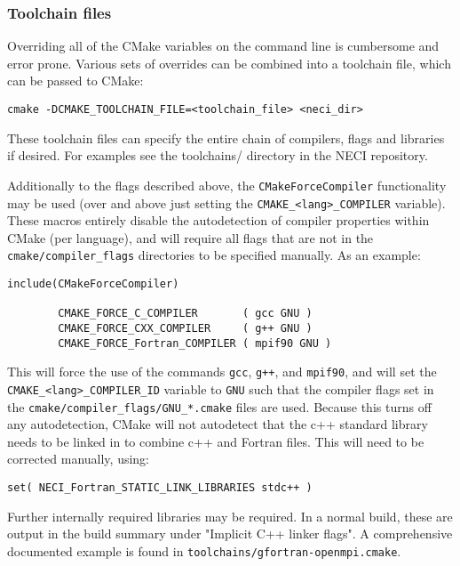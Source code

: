 \documentclass[a4paper,notitlepage,dvipsnames]{scrreprt}
\let\code\lstinline
\begin{document}
\subsubsection{Toolchain files}

    Overriding all of the CMake variables on the command line is cumbersome and error prone.
    Various sets of overrides can be combined into a toolchain file, which can be passed
    to CMake:
    \begin{lstlisting}[gobble=4]
        cmake -DCMAKE_TOOLCHAIN_FILE=<toolchain_file> <neci_dir>
    \end{lstlisting}
    These toolchain files can specify the entire chain of compilers, flags and libraries if
    desired. For examples see the toolchains/ directory in the NECI repository.

    Additionally to the flags described above, the \code{CMakeForceCompiler} functionality may
    be used (over and above just setting the \code{CMAKE_<lang>_COMPILER} variable).
    These macros entirely disable the autodetection of compiler properties within
    CMake (per language), and will require all flags that are not in the
    \code{cmake/compiler_flags} directories to be specified manually. As an example:
    \begin{lstlisting}[gobble=4]
        include(CMakeForceCompiler)

        CMAKE_FORCE_C_COMPILER       ( gcc GNU )
        CMAKE_FORCE_CXX_COMPILER     ( g++ GNU )
        CMAKE_FORCE_Fortran_COMPILER ( mpif90 GNU )
    \end{lstlisting}
    This will force the use of the commands \code{gcc}, \code{g++}, and \code{mpif90}, and will
    set the \code[breaklines=true]{CMAKE_<lang>_COMPILER_ID} variable to \code{GNU} such that
    the compiler flags set in the \code[breaklines=true]{cmake/compiler_flags/GNU_*.cmake}
    files are used. Because this turns off
    any autodetection, CMake will not autodetect that the c++ standard library needs to be
    linked in to combine c++ and Fortran files. This will need to be corrected manually, using:
    \begin{lstlisting}[gobble=4]
        set( NECI_Fortran_STATIC_LINK_LIBRARIES stdc++ )
    \end{lstlisting}
    Further internally required libraries may be required. In a normal build, these are
    output in the build summary under "Implicit C++ linker flags".
    A comprehensive documented example is found in \code{toolchains/gfortran-openmpi.cmake}.
\end{document}
